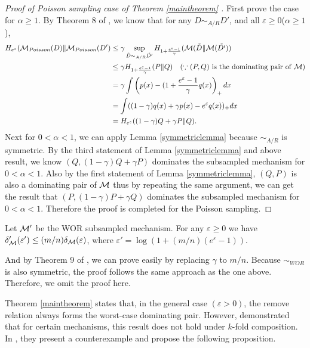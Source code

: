 \documentclass{article}
\begin{document}
\begin{proof}[Proof of Poisson sampling case of Theorem \ref{maintheorem} ]
First prove the case for $\alpha \ge 1$. By Theorem 8 of \cite{balle2018privacy}, we know that for any $D\sim_{A/R} D'$, and all $\varepsilon \ge 0$($\alpha \ge 1$),
\begin{align*}
    H_{e^\varepsilon}({\mathcal{M}}_{Poisson}(D) \Vert {\mathcal{M}}_{Poisson}(D') &\le \gamma \sup_{\tilde{D} \sim_{A/R}\tilde{D'}}H_{1+ \frac{e
    ^\varepsilon-1}{\gamma}}({\mathcal{M}}(\tilde{D} \Vert {\mathcal{M}}(\tilde{D'}))\\
    &\le \gamma H_{1+ \frac{e^\varepsilon - 1}{\gamma}} (P \Vert Q) \quad(\because (P,Q) \text{ is the dominating pair of }{\mathcal{M}}) \\
    &= \gamma \int \left(p(x) - (1+ \frac{e^\varepsilon - 1}{\gamma}q(x) \right)_+ dx \\
    &= \int ((1-\gamma)q(x) + \gamma p(x) - e^\varepsilon q(x))_+ dx \\
    &= H_{e^\varepsilon}((1-\gamma)Q +\gamma P \Vert Q).
\end{align*}
Next for $0< \alpha < 1$, we can apply Lemma \ref{symmetriclemma} because $\sim_{A/R}$ is symmetric. By the third statement of Lemma \ref{symmetriclemma} and above result, we know $(Q,(1-\gamma)Q + \gamma P)$ dominates the subsampled mechanism for $0 < \alpha < 1$. Also by the first statement of Lemma \ref{symmetriclemma}, $(Q,P)$ is also a dominating pair of ${\mathcal{M}}$ thus by repeating the same argument, we can get the result that $(P,(1-\gamma)P+\gamma Q)$ dominates the subsampled mechanism for $0 <\alpha<1$. Therefore the proof is completed for the Poisson sampling.
\end{proof}
\begin{theorem}
     Let ${\mathcal{M}}'$ be the WOR subsampled mechanism. For any $\varepsilon \ge 0$ we have $\delta_{\mathcal{M}}'(\varepsilon') \le (m/n) \delta_{\mathcal{M}}(\varepsilon)$, where $\varepsilon' = \log(1+(m/n)(e^\varepsilon - 1))$.  
\end{theorem}
And by Theorem 9 of \cite{balle2018privacy}, we can prove easily by replacing $\gamma$ to $m/n$. Because $\sim_{WOR}$ is also symmetric, the proof follows the same approach as the one above. Therefore, we omit the proof here. 

Theorem \ref{maintheorem} states that, in the general case $(\varepsilon > 0)$, the remove relation always forms the worst-case dominating pair. However, \cite{lebeda2024avoiding} demonstrated that for certain mechanisms, this result does not hold under $k$-fold composition. In \cite{lebeda2024avoiding}, they present a counterexample and propose the following proposition.
\end{document}
